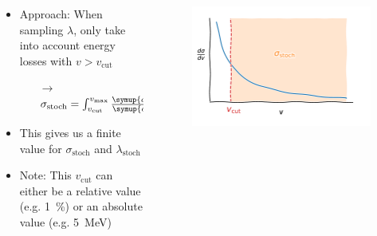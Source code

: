 \documentclass[aspectratio=1610, 9pt]{beamer}
\begin{document}
\begin{frame}[c]
    \begin{columns}[onlytextwidth]

      \begin{column}{0.5\textwidth}
        \begin{itemize}
            \item Approach: When sampling $\lambda$, only take into account energy losses with $v > v_\text{cut}$
            \begin{itemize}
                \item[$\rightarrow$] $\sigma_\text{stoch} = \int_{v_\text{cut}}^{v_\text{max}} \frac{\symup{d}\sigma}{\symup{d}v} \, \symup{d}v$
            \end{itemize}
            \item This gives us a finite value for $\sigma_\text{stoch}$ and $\lambda_\text{stoch}$
            \item Note: This $v_\text{cut}$ can either be a relative value (e.g. \SI{1}{\percent}) or an absolute value (e.g. \SI{5}{\mega\electronvolt})
        \end{itemize}
      \end{column}

    \begin{column}{0.5\textwidth}
      \begin{figure}
        \includegraphics[width=\textwidth]{diverging_v_stoch.pdf}
      \end{figure}
    \end{column}
    \end{columns}
\end{frame}
\end{document}
